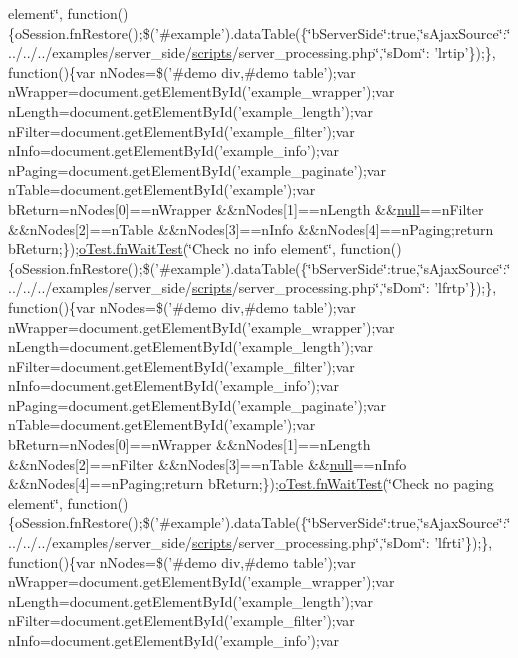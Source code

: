 \begin{DoxyCompactItemize}
element\char`\"{}, function()\{o\+Session.\+fn\+Restore();\$('\#example').data\+Table(\{\char`\"{}b\+Server\+Side\char`\"{}\+:true,\char`\"{}s\+Ajax\+Source\char`\"{}\+:\char`\"{}../../../examples/server\+\_\+side/\hyperlink{tinymce_8jquery_8dev_8js_a09066d4d580eeec222f858d588b4cdef}{scripts}/server\+\_\+processing.\+php\char`\"{},\char`\"{}s\+Dom\char`\"{}\+: 'lrtip'\});\}, function()\{var n\+Nodes=\$('\#demo div,\#demo table');var n\+Wrapper=document.\+get\+Element\+By\+Id('example\+\_\+wrapper');var n\+Length=document.\+get\+Element\+By\+Id('example\+\_\+length');var n\+Filter=document.\+get\+Element\+By\+Id('example\+\_\+filter');var n\+Info=document.\+get\+Element\+By\+Id('example\+\_\+info');var n\+Paging=document.\+get\+Element\+By\+Id('example\+\_\+paginate');var n\+Table=document.\+get\+Element\+By\+Id('example');var b\+Return=n\+Nodes\mbox{[}0\mbox{]}==n\+Wrapper \&\&n\+Nodes\mbox{[}1\mbox{]}==n\+Length \&\&\hyperlink{validate_8js_afb8e110345c45e74478894341ab6b28e}{null}==n\+Filter \&\&n\+Nodes\mbox{[}2\mbox{]}==n\+Table \&\&n\+Nodes\mbox{[}3\mbox{]}==n\+Info \&\&n\+Nodes\mbox{[}4\mbox{]}==n\+Paging;return b\+Return;\});\hyperlink{onhold_24__server-side_2__zero__config_8js_ab25c4d596771c0133cdc45178ce72c3d}{o\+Test.\+fn\+Wait\+Test}(\char`\"{}Check no info element\char`\"{}, function()\{o\+Session.\+fn\+Restore();\$('\#example').data\+Table(\{\char`\"{}b\+Server\+Side\char`\"{}\+:true,\char`\"{}s\+Ajax\+Source\char`\"{}\+:\char`\"{}../../../examples/server\+\_\+side/\hyperlink{tinymce_8jquery_8dev_8js_a09066d4d580eeec222f858d588b4cdef}{scripts}/server\+\_\+processing.\+php\char`\"{},\char`\"{}s\+Dom\char`\"{}\+: 'lfrtp'\});\}, function()\{var n\+Nodes=\$('\#demo div,\#demo table');var n\+Wrapper=document.\+get\+Element\+By\+Id('example\+\_\+wrapper');var n\+Length=document.\+get\+Element\+By\+Id('example\+\_\+length');var n\+Filter=document.\+get\+Element\+By\+Id('example\+\_\+filter');var n\+Info=document.\+get\+Element\+By\+Id('example\+\_\+info');var n\+Paging=document.\+get\+Element\+By\+Id('example\+\_\+paginate');var n\+Table=document.\+get\+Element\+By\+Id('example');var b\+Return=n\+Nodes\mbox{[}0\mbox{]}==n\+Wrapper \&\&n\+Nodes\mbox{[}1\mbox{]}==n\+Length \&\&n\+Nodes\mbox{[}2\mbox{]}==n\+Filter \&\&n\+Nodes\mbox{[}3\mbox{]}==n\+Table \&\&\hyperlink{validate_8js_afb8e110345c45e74478894341ab6b28e}{null}==n\+Info \&\&n\+Nodes\mbox{[}4\mbox{]}==n\+Paging;return b\+Return;\});\hyperlink{onhold_24__server-side_2__zero__config_8js_ab25c4d596771c0133cdc45178ce72c3d}{o\+Test.\+fn\+Wait\+Test}(\char`\"{}Check no paging element\char`\"{}, function()\{o\+Session.\+fn\+Restore();\$('\#example').data\+Table(\{\char`\"{}b\+Server\+Side\char`\"{}\+:true,\char`\"{}s\+Ajax\+Source\char`\"{}\+:\char`\"{}../../../examples/server\+\_\+side/\hyperlink{tinymce_8jquery_8dev_8js_a09066d4d580eeec222f858d588b4cdef}{scripts}/server\+\_\+processing.\+php\char`\"{},\char`\"{}s\+Dom\char`\"{}\+: 'lfrti'\});\}, function()\{var n\+Nodes=\$('\#demo div,\#demo table');var n\+Wrapper=document.\+get\+Element\+By\+Id('example\+\_\+wrapper');var n\+Length=document.\+get\+Element\+By\+Id('example\+\_\+length');var n\+Filter=document.\+get\+Element\+By\+Id('example\+\_\+filter');var n\+Info=document.\+get\+Element\+By\+Id('example\+\_\+info');var 
\end{DoxyCompactItemize}
